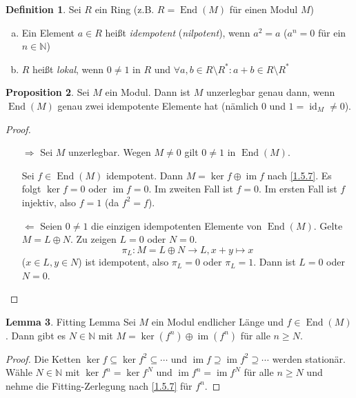 \documentclass[
twoside=semi,
fontsize=12,
DIV=12, 
cleardoublepage=current,
leqno,
headings=optiontoheadandtoc, 
toc=idx
]{scrbook}
\newcommand{\N}{\mathbb{N}}
\DeclareMathOperator{\im}{im}
\DeclareMathOperator{\id}{id}
\DeclareMathOperator{\End}{End}
\theoremstyle{definition}
\newtheorem{definition}{Definition}[section]
\newtheorem{lemma}[definition]{Lemma}
\newtheorem{proposition}[definition]{Proposition}
\begin{document}
	\begin{definition}\label{1.5.8}
		Sei $R$ ein Ring (z.B. $R = \End(M)$ f\"ur einen Modul $M$)
		
		\begin{enumerate}[(a)]
			\item Ein Element $a \in R$ hei\ss t \emph{idempotent} (\emph{nilpotent}), wenn $a^2 = a$ ($a^n = 0$ f\"ur ein $n \in \N$)
			
			\item $R$ hei\ss t \emph{lokal}, wenn $0\neq 1$ in $R$ und $\forall a,b \in R\setminus R^*: a + b \in R\setminus R^*$
		\end{enumerate}
	\end{definition}

	\begin{proposition}\label{1.5.9}
		Sei $M$ ein Modul. Dann ist $M$ unzerlegbar genau dann, wenn $\End(M)$ genau zwei idempotente Elemente hat (n\"amlich $0$ und $1 = \id_M \neq 0$).
		
		\begin{proof}
			\begin{enumerate}
				\item[$\Rightarrow$] Sei $M$ unzerlegbar. Wegen $M \neq 0$ gilt $0 \neq 1$ in $\End(M)$.
				
				Sei $f \in \End(M)$ idempotent. Dann $M = \ker f \oplus \im f$ nach \ref{1.5.7}. Es folgt $\ker f = 0$ oder $\im f = 0$. Im zweiten Fall ist $f = 0$. Im ersten Fall ist $f$ injektiv, also $f=1$ (da $f^2 = f$).
				
				\item[$\Leftarrow$] Seien $0\neq 1$ die einzigen idempotenten Elemente von $\End(M)$. Gelte $M = L \oplus N$. Zu zeigen $L = 0$ oder $N = 0$. 
					\[\pi_L:M=L\oplus N \to L, x + y \mapsto x\]
				($x\in L, y \in N$) ist idempotent, also $\pi_L = 0$ oder $\pi_L = 1$. Dann ist $L = 0$ oder $N = 0$.
			\end{enumerate}
		\end{proof}
	\end{proposition}

	\begin{lemma}\label{1.5.10}
		Fitting Lemma\newline
		Sei $M$ ein Modul endlicher L\"ange und $f \in \End(M)$. Dann gibt es $N \in \N$ mit $M = \ker(f^n) \oplus \im(f^n)$ f\"ur alle $n\geq N$.
		
		\begin{proof}
			Die Ketten $\ker f \subseteq \ker f^2 \subseteq \cdots$ und $\im f \supseteq \im f^2 \supseteq \cdots$ werden station\"ar. W\"ahle $N \in \N$ mit $\ker f^n = \ker f^N$ und $\im f^n = \im f^N$ f\"ur alle $n \geq N$ und nehme die Fitting-Zerlegung nach \ref{1.5.7} f\"ur $f^n$.
		\end{proof}
	\end{lemma}
\end{document}
